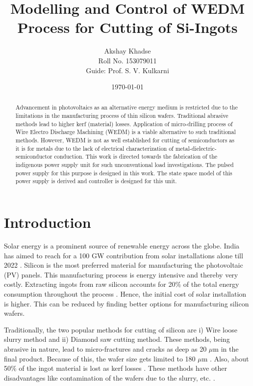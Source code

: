 \documentclass[a4paper]{IEEEtran}
\begin{document}
\title{Modelling and Control of WEDM Process for Cutting of Si-Ingots}
\author{Akshay Khadse \\ Roll No. 153079011 \\ Guide: Prof. S. V. Kulkarni}
\date{\today}
\maketitle

\begin{abstract}
	Advancement in photovoltaics as an alternative energy medium is restricted due to the limitations in the manufacturing process of thin silicon wafers. Traditional abrasive methods lead to higher kerf (material) losses. Application of micro-drilling process of Wire Electro Discharge Machining (WEDM) is a viable alternative to such traditional methods. However, WEDM is not as well established for cutting of semiconductors as it is for metals due to the lack of electrical characterization of metal-dielectric-semiconductor conduction. This work is directed towards the fabrication of the indigenous power supply unit for such unconventional load investigations. The pulsed power supply for this purpose is designed in this work. The state space model of this power supply is derived and controller is designed for this unit.
\end{abstract}

\section{Introduction}
	Solar energy is a prominent source of renewable energy across the globe. India has aimed to reach for a 100 GW contribution from solar installations alone till 2022 \cite{mnreReport}. Silicon is the most preferred material for manufacturing the photovoltaic (PV) panels. This manufacturing process is energy intensive and thereby very costly. Extracting ingots from raw silicon accounts for 20\% of the total energy consumption throughout the process \cite{del09}. Hence, the initial cost of solar installation is higher. This can be reduced by finding better options for manufacturing silicon wafers.

	Traditionally, the two popular methods for cutting of silicon are i) Wire loose slurry method and ii) Diamond saw cutting method. These methods, being abrasive in nature, lead to micro-fractures and cracks as deep as 20 $\mu$m in the final product. Because of this, the wafer size gets limited to 180 $\mu$m \cite{sopori13}. Also, about 50\% of the ingot material is lost as kerf losses \cite{joshi10}. These methods have other disadvantages like contamination of the wafers due to the slurry, etc. \cite{moeller2015}.
\end{document}
